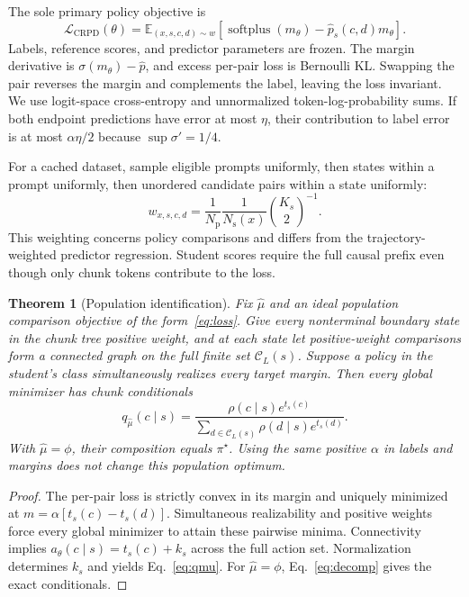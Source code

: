 \documentclass[pdflatex,sn-mathphys-num,review]{sn-jnl}
\theoremstyle{thmstyleone}
\newtheorem{theorem}{Theorem}[section]
\theoremstyle{thmstyletwo}
\theoremstyle{thmstylethree}
\providecommand{\popt}{\pi^{\star}}
\providecommand{\E}{\mathbb{E}}
\providecommand{\softplus}{\operatorname{softplus}}
\providecommand{\Cset}{\mathcal{C}}
\providecommand{\muhat}{\widehat{\mu}}
\providecommand{\phat}{\widehat{p}}
\begin{document}
The sole primary policy objective is
\begin{equation}
\mathcal L_{\mathrm{CRPD}}(\theta)=\E_{(x,s,c,d)\sim w}
\left[\softplus(m_\theta)-\phat_s(c,d)m_\theta\right].
\label{eq:loss}
\end{equation}
Labels, reference scores, and predictor parameters are frozen. The margin derivative is $\sigma(m_\theta)-\phat$, and excess per-pair loss is Bernoulli KL. Swapping the pair reverses the margin and complements the label, leaving the loss invariant. We use logit-space cross-entropy and unnormalized token-log-probability sums. If both endpoint predictions have error at most $\eta$, their contribution to label error is at most $\alpha\eta/2$ because $\sup\sigma'=1/4$.

For a cached dataset, sample eligible prompts uniformly, then states within a prompt uniformly, then unordered candidate pairs within a state uniformly:
\begin{equation}
w_{x,s,c,d}=\frac1{N_{\mathrm p}}\frac1{N_{\mathrm s}(x)}\binom{K_s}{2}^{-1}.
\label{eq:weights}
\end{equation}
This weighting concerns policy comparisons and differs from the trajectory-weighted predictor regression. Student scores require the full causal prefix even though only chunk tokens contribute to the loss.

\begin{theorem}[Population identification]
\label{thm:recovery}
Fix $\muhat$ and an ideal population comparison objective of the form~\eqref{eq:loss}. Give every nonterminal boundary state in the chunk tree positive weight, and at each state let positive-weight comparisons form a connected graph on the full finite set $\Cset_L(s)$. Suppose a policy in the student's class simultaneously realizes every target margin. Then every global minimizer has chunk conditionals
\begin{equation}
q_{\muhat}(c\mid s)=\frac{\rho(c\mid s)e^{t_s(c)}}{\sum_{d\in\Cset_L(s)}\rho(d\mid s)e^{t_s(d)}}.
\label{eq:qmu}
\end{equation}
With $\muhat=\phi$, their composition equals $\popt$. Using the same positive $\alpha$ in labels and margins does not change this population optimum.
\end{theorem}
\begin{proof}
The per-pair loss is strictly convex in its margin and uniquely minimized at $m=\alpha[t_s(c)-t_s(d)]$. Simultaneous realizability and positive weights force every global minimizer to attain these pairwise minima. Connectivity implies $a_\theta(c\mid s)=t_s(c)+k_s$ across the full action set. Normalization determines $k_s$ and yields Eq.~\eqref{eq:qmu}. For $\muhat=\phi$, Eq.~\eqref{eq:decomp} gives the exact conditionals.
\end{proof}
\end{document}
